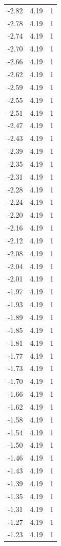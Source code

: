\begin{longtable}{lrr}
  -2.82 & 4.19 & 1 \\
  -2.78 & 4.19 & 1 \\
  -2.74 & 4.19 & 1 \\
  -2.70 & 4.19 & 1 \\
  -2.66 & 4.19 & 1 \\
  -2.62 & 4.19 & 1 \\
  -2.59 & 4.19 & 1 \\
  -2.55 & 4.19 & 1 \\
  -2.51 & 4.19 & 1 \\
  -2.47 & 4.19 & 1 \\
  -2.43 & 4.19 & 1 \\
  -2.39 & 4.19 & 1 \\
  -2.35 & 4.19 & 1 \\
  -2.31 & 4.19 & 1 \\
  -2.28 & 4.19 & 1 \\
  -2.24 & 4.19 & 1 \\
  -2.20 & 4.19 & 1 \\
  -2.16 & 4.19 & 1 \\
  -2.12 & 4.19 & 1 \\
  -2.08 & 4.19 & 1 \\
  -2.04 & 4.19 & 1 \\
  -2.01 & 4.19 & 1 \\
  -1.97 & 4.19 & 1 \\
  -1.93 & 4.19 & 1 \\
  -1.89 & 4.19 & 1 \\
  -1.85 & 4.19 & 1 \\
  -1.81 & 4.19 & 1 \\
  -1.77 & 4.19 & 1 \\
  -1.73 & 4.19 & 1 \\
  -1.70 & 4.19 & 1 \\
  -1.66 & 4.19 & 1 \\
  -1.62 & 4.19 & 1 \\
  -1.58 & 4.19 & 1 \\
  -1.54 & 4.19 & 1 \\
  -1.50 & 4.19 & 1 \\
  -1.46 & 4.19 & 1 \\
  -1.43 & 4.19 & 1 \\
  -1.39 & 4.19 & 1 \\
  -1.35 & 4.19 & 1 \\
  -1.31 & 4.19 & 1 \\
  -1.27 & 4.19 & 1 \\
  -1.23 & 4.19 & 1 \\

\end{longtable}
